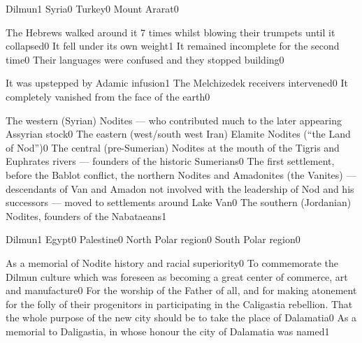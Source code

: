 {Dilmun}{1}
{Syria}{0}
{Turkey}{0}
{Mount Ararat}{0}
\qstop

{The Hebrews walked around it 7 times whilst blowing their trumpets until it collapsed}{0}
{It fell under its own weight}{1}
{It remained incomplete for the second time}{0}
{Their languages were confused and they stopped building}{0}
\qstop

{It was upstepped by Adamic infusion}{1}
{The Melchizedek receivers intervened}{0}
{It completely vanished from the face of the earth}{0}
\qstop

{The western (Syrian) Nodites --- who contributed much to the later appearing Assyrian stock}{0}
{The eastern (west/south west Iran) Elamite Nodites (``the Land of Nod'')}{0}
{The central (pre-Sumerian) Nodites at the mouth of the Tigris and Euphrates rivers --- founders of the historic Sumerians}{0}
{The first settlement, before the Bablot conflict, the northern Nodites and Amadonites (the Vanites) --- descendants of Van and Amadon not involved with the leadership of Nod and his successors --- moved to settlements around Lake Van}{0}
{The southern (Jordanian) Nodites, founders of the Nabataeans}{1}
\qstop

{Dilmun}{1}
{Egypt}{0}
{Palestine}{0}
{North Polar region}{0}
{South Polar region}{0}
\qstop

{As a memorial of Nodite history and racial superiority}{0}
{To commemorate the Dilmun culture which was foreseen as becoming a great center of commerce, art and manufacture}{0}
{For the worship of the Father of all, and for making atonement for the folly of their progenitors in participating in the Caligastia rebellion. That the whole purpose of the new city should be to take the place of Dalamatia}{0}
{As a memorial to Daligastia, in whose honour the city of Dalamatia was named}{1}
\qstop

